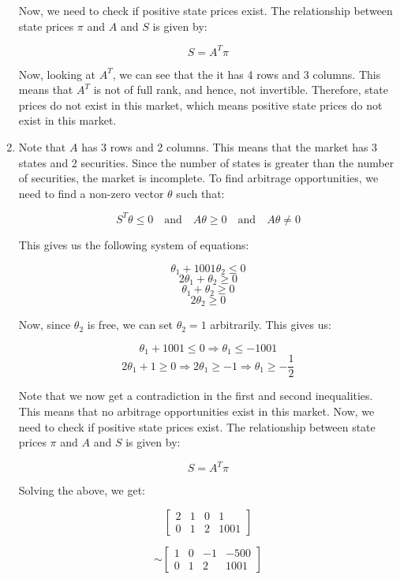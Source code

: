\documentclass[a4paper]{article}
\begin{document}
\begin{enumerate}[label=(\alph*)]
    Now, we need to check if positive state prices exist. The relationship between state prices $\pi$ and $A$ and $S$ is given by:

    \[ S = A^{T}\pi \]

    Now, looking at $A^{T}$, we can see that the it has 4 rows and 3 columns. This means that $A^{T}$ is not of full rank, and hence, not invertible. Therefore, state prices do not exist in this market, which means positive state prices do not exist in this market.


    \vspace{10mm}
    \item Note that $A$ has 3 rows and 2 columns. This means that the market has 3 states and 2 securities. Since the number of states is greater than the number of securities, the market is incomplete. To find arbitrage opportunities, we need to find a non-zero vector $\theta$ such that:

    \[ S^{T}\theta \leq 0 \quad \text{and} \quad A\theta \geq 0 \quad \text{and} \quad A\theta \neq 0 \]

    This gives us the following system of equations:

    \[ \theta_{1} + 1001\theta_{2} \leq 0 \]
    \[ 2\theta_{1} + \theta_{2} \geq 0 \]
    \[ \theta_{1} + \theta_{2} \geq 0 \]
    \[ 2\theta_{2} \geq 0 \]

    Now, since $\theta_{2}$ is free, we can set $\theta_{2} = 1$ arbitrarily. This gives us:

    \[ \theta_{1} + 1001 \leq 0 \Rightarrow \theta_{1} \leq -1001 \]
    \[ 2\theta_{1} + 1 \geq 0 \Rightarrow 2\theta_{1} \geq -1 \Rightarrow \theta_{1} \geq -\frac{1}{2} \]

    Note that we now get a contradiction in the first and second inequalities. This means that no arbitrage opportunities exist in this market. Now, we need to check if positive state prices exist. The relationship between state prices $\pi$ and $A$ and $S$ is given by:

    \[ S = A^{T}\pi \]

    Solving the above, we get:

    \[ \left[\begin{array}{ccc|c}
        2 & 1 & 0 & 1 \\ 
        0 & 1 & 2 & 1001
    \end{array}\right] \]


    \[ \sim \left[\begin{array}{ccc|c}
        1 & 0 & -1 & -500 \\ 
        0 & 1 & 2 & 1001
    \end{array}\right] \]


\end{enumerate}
\end{document}
